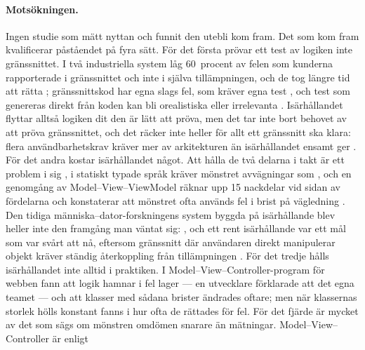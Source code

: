 \paragraph{Motsökningen.}  Ingen studie som mätt nyttan och funnit den
utebli kom fram.  Det som kom fram kvalificerar påståendet på fyra
sätt.  För det första prövar ett test av logiken inte gränssnittet.  I
två industriella system låg 60~procent av felen som kunderna
rapporterade i gränssnittet och inte i själva tillämpningen, och de
tog längre tid att rätta \autocite{RobinsonBrooks2009}; gränssnittskod
har egna slags fel, som kräver egna test \autocite{Lelli2015GUIDefects},
och test som genereras direkt från koden kan bli orealistiska eller
irrelevanta \autocite{Gross2012EXSYST}.
Isärhållandet flyttar alltså logiken dit den är lätt att pröva, men det
tar inte bort behovet av att pröva gränssnittet, och det räcker inte
heller för allt ett gränssnitt ska klara: flera användbarhetskrav
kräver mer av arkitekturen än isärhållandet ensamt ger
\autocite{John2005Usability}.  För det andra kostar
isärhållandet något.  Att hålla de två delarna i takt är ett problem i
sig \autocite{SotirovskiKruchten1995}, i statiskt typade språk kräver
mönstret avvägningar som , och en genomgång av Model--View--ViewModel
räknar upp 15 nackdelar vid sidan av fördelarna och konstaterar att
mönstret ofta används fel i brist på vägledning
\autocite{Fuksa2025MVVM}.  Den tidiga människa--dator-forskningens
system byggda på isärhållande blev heller inte den framgång man väntat
sig: , och ett rent isärhållande var ett mål som var svårt att
nå, eftersom gränssnitt där användaren direkt manipulerar objekt
kräver ständig återkoppling från tillämpningen \autocite{Hill1992ALV}.
För det tredje hålls isärhållandet inte alltid i praktiken.  I
Model--View--Controller-program för webben fann
\textcite{Aniche2018MVCSmells} att logik hamnar i fel lager --- en
utvecklare förklarade att det egna teamet
 ---
och att klasser med sådana brister ändrades oftare; men när klassernas
storlek hölls konstant fanns  i hur ofta de rättades för fel.  För det fjärde
är mycket av det som sägs om mönstren omdömen snarare än mätningar.
Model--View--Controller är enligt
